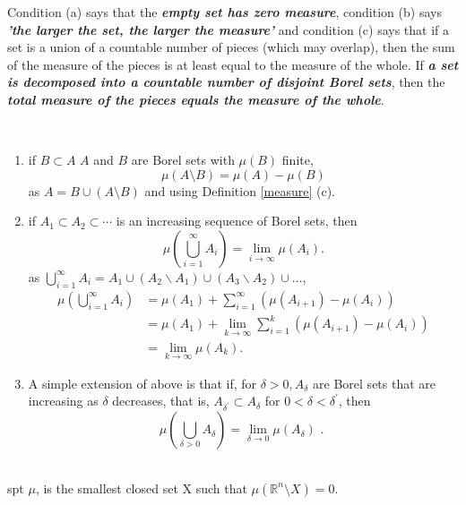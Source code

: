 Condition (a) says that the \textit{\textbf{empty set has
zero measure}}, condition (b) says \textit{\textbf{'the larger the set, the larger the measure'}} and condition (c) says that if a set is a union of a countable number of pieces (which may overlap), then the sum of the measure of the pieces is at least equal to the measure of the whole. If \textit{\textbf{a set is decomposed into a countable number of disjoint Borel sets}}, then the \textit{\textbf{total measure of the pieces equals the measure of the whole}}.

\begin{property}[Measure]\label{propmeasure} $ $
\begin{enumerate}
    \item if $B\subset A$ $A$ and $B$ are Borel sets with $\mu(B)$ finite, 
    $$\mu(A\setminus B) = \mu(A) - \mu(B)$$ 
    as $A = B\cup(A\setminus B)$ and using Definition \ref{measure} (c).
    \item if $A_{1} \subset A_{2} \subset \cdots$ is an increasing sequence of Borel sets, then
    $$
    \mu\left(\bigcup_{i=1}^{\infty} A_{i}\right)=\lim _{i \rightarrow \infty} \mu\left(A_{i}\right) .
    $$
    as $\displaystyle\bigcup_{i=1}^{\infty} A_{i}=A_{1} \cup\left(A_{2} \backslash A_{1}\right) \cup\left(A_{3} \backslash A_{2}\right) \cup \dots$,
    $$\begin{aligned} \mu\left(\bigcup_{i=1}^{\infty} A_{i}\right) &=\mu\left(A_{1}\right)+\sum_{i=1}^{\infty}\left(\mu\left(A_{i+1}\right)-\mu\left(A_{i}\right)\right) \\ &=\mu\left(A_{1}\right)+\lim _{k \rightarrow \infty} \sum_{i=1}^{k}\left(\mu\left(A_{i+1}\right)-\mu\left(A_{i}\right)\right) \\ &=\lim _{k \rightarrow \infty} \mu\left(A_{k}\right) . \end{aligned}$$
    \item A simple extension of above is that if, for $\delta>0, A_{\delta}$ are Borel sets that are increasing as $\delta$ decreases, that is, $A_{\delta^{\prime}} \subset A_{\delta}$ for $0<\delta<\delta^{\prime}$, then
    $$
    \mu\left(\bigcup_{\delta>0} A_{\delta}\right)=\lim _{\delta \rightarrow 0} \mu\left(A_{\delta}\right) \text { . }
    $$
\end{enumerate}
\end{property}

\begin{definition}[Support of $\mu$] $ $\\
    spt $\mu$, is the smallest closed set X such that $\mu(\mathbb{R}^n\setminus X) = 0$. 
\end{definition}

